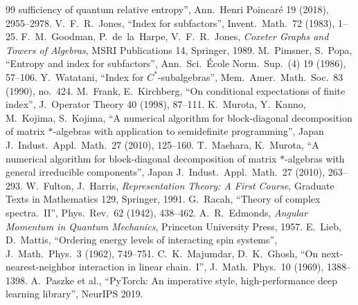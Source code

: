 \documentclass[11pt]{article}
\begin{document}
{\begin{thebibliography}{99}
  sufficiency of quantum relative entropy'', Ann.\ Henri Poincar\'e 19 (2018), 2955--2978.
 V.~F.~R.~Jones, ``Index for subfactors'', Invent.\ Math.\ 72 (1983), 1--25.
 F.~M.~Goodman, P.~de~la~Harpe, V.~F.~R.~Jones, \emph{Coxeter Graphs and Towers of Algebras}, MSRI
  Publications 14, Springer, 1989.
 M.~Pimsner, S.~Popa, ``Entropy and index for subfactors'', Ann.\ Sci.\ \'Ecole Norm.\ Sup.\ (4)
  19 (1986), 57--106.
 Y.~Watatani, ``Index for $C^*$-subalgebras'', Mem.\ Amer.\ Math.\ Soc.\ 83 (1990), no.~424.
 M.~Frank, E.~Kirchberg, ``On conditional expectations of finite index'', J.\ Operator Theory 40
  (1998), 87--111.
 K.~Murota, Y.~Kanno, M.~Kojima, S.~Kojima, ``A numerical algorithm for block-diagonal
  decomposition of matrix $*$-algebras with application to semidefinite programming'', Japan J.\ Indust.\ Appl.\
  Math.\ 27 (2010), 125--160.
 T.~Maehara, K.~Murota, ``A numerical algorithm for block-diagonal decomposition of matrix
  $*$-algebras with general irreducible components'', Japan J.\ Indust.\ Appl.\ Math.\ 27 (2010), 263--293.
\bibitem{fulton1991} W.~Fulton, J.~Harris, \emph{Representation Theory: A First Course}, Graduate Texts in
  Mathematics 129, Springer, 1991.
 G.~Racah, ``Theory of complex spectra.~II'', Phys.\ Rev.\ 62 (1942), 438--462.
\bibitem{edmonds1957} A.~R.~Edmonds, \emph{Angular Momentum in Quantum Mechanics}, Princeton University Press, 1957.
\bibitem{lieb1962} E.~Lieb, D.~Mattis, ``Ordering energy levels of interacting spin systems'', J.\ Math.\ Phys.\ 3
  (1962), 749--751.
 C.~K.~Majumdar, D.~K.~Ghosh, ``On next-nearest-neighbor interaction in linear chain.~I'',
  J.\ Math.\ Phys.\ 10 (1969), 1388--1398.
 A.~Paszke et al., ``PyTorch: An imperative style, high-performance deep learning
  library'', NeurIPS 2019.
\end{thebibliography}
}
\end{document}

